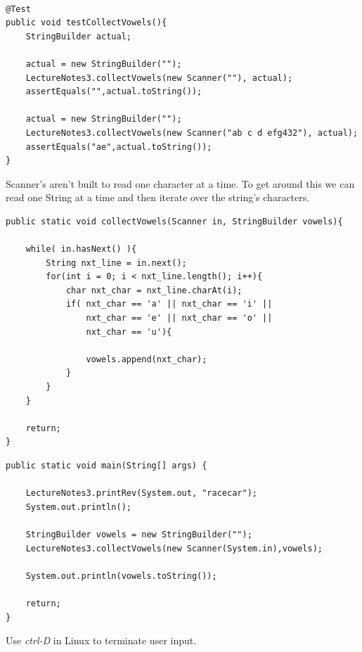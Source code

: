 \documentclass[]{tufte-handout}
\begin{document}
\begin{lstlisting}

@Test
public void testCollectVowels(){
	StringBuilder actual;
	
	actual = new StringBuilder("");		
	LectureNotes3.collectVowels(new Scanner(""), actual);
	assertEquals("",actual.toString());
	
	actual = new StringBuilder("");		
	LectureNotes3.collectVowels(new Scanner("ab c d efg432"), actual);
	assertEquals("ae",actual.toString());
}

\end{lstlisting}

Scanner's aren't built to read one character at a time. To get around this we can read one String at a time and then iterate over the string's characters.

\begin{lstlisting}
public static void collectVowels(Scanner in, StringBuilder vowels){
		
	while( in.hasNext() ){
		String nxt_line = in.next();
		for(int i = 0; i < nxt_line.length(); i++){
			char nxt_char = nxt_line.charAt(i);
			if( nxt_char == 'a' || nxt_char == 'i' || 
				nxt_char == 'e' || nxt_char == 'o' ||
				nxt_char == 'u'){
				
				vowels.append(nxt_char);
			}
		}
	}
	
	return;
}
\end{lstlisting}

\begin{lstlisting}
public static void main(String[] args) {
		
	LectureNotes3.printRev(System.out, "racecar");
	System.out.println();
	
	StringBuilder vowels = new StringBuilder("");
	LectureNotes3.collectVowels(new Scanner(System.in),vowels);
		
	System.out.println(vowels.toString());
	
	return;
}
\end{lstlisting}

Use \textit{ctrl-D} in Linux to terminate user input. 
\end{document}
